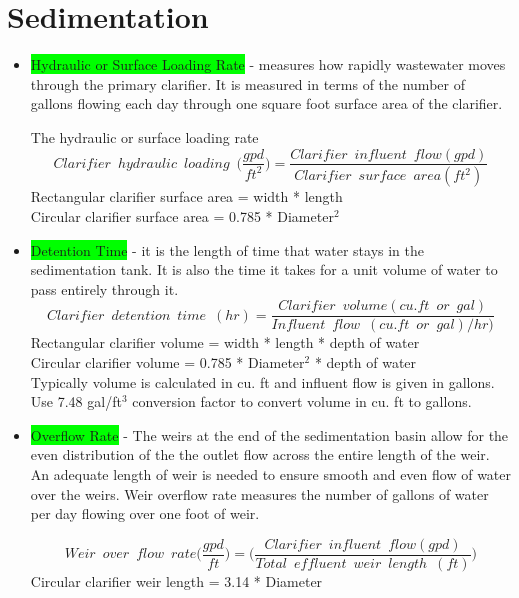 \documentclass{article}
\begin{document}
\section{Sedimentation}
\begin{itemize}
\item \colorbox{lime}{Hydraulic or Surface Loading Rate} - measures how rapidly wastewater moves through the primary clarifier.  It is measured in terms of the number of gallons flowing each day through one square foot surface area of the clarifier.

The hydraulic or surface loading rate  
$$Clarifier \enspace hydraulic \enspace loading \enspace 	\Big(\dfrac{gpd}{ft^2}\Big) =\dfrac{Clarifier \enspace influent 	\enspace flow (gpd)}{Clarifier \enspace surface \enspace area 	(ft^2)}$$ 
		Rectangular clarifier surface area  = width * length\\
		Circular clarifier surface area  = 0.785 * Diameter$^2 $\\
\item \colorbox{lime}{Detention Time} - it is the length of time that water stays in the sedimentation tank.  It is also the time it takes for a unit volume of water to pass entirely through it.\\
$$Clarifier \enspace detention \enspace time \enspace (hr) = 	\dfrac{ Clarifier \enspace volume (cu.ft \enspace or \enspace gal)}{Influent \enspace flow \enspace (cu.ft \enspace or \enspace gal)/hr)}$$
Rectangular clarifier volume = width * length * depth of water\\
Circular clarifier volume = 0.785 * Diameter$^2$ * depth of water\\
Typically volume is calculated in cu. ft and influent flow is given in gallons.  Use 7.48 gal/ft$^3$ conversion factor to convert volume in cu. ft to gallons.\\

\item \colorbox{lime}{Overflow Rate} - The weirs at the end of the sedimentation basin allow for the even distribution of the the outlet flow across the entire length of the weir.  An adequate length of weir is needed to ensure smooth and even flow of water over the weirs.  Weir overflow rate measures the number of gallons of water per day flowing over one foot of weir. 

		$$Weir \enspace over \enspace flow \enspace rate \Big(\dfrac{gpd}{ft}\Big) =\Big(\dfrac{Clarifier \enspace influent \enspace  flow (gpd)}{Total \enspace effluent 					\enspace weir \enspace length \enspace (ft)}\Big)$$
		Circular clarifier weir length = 3.14 * Diameter\\


\end{itemize}
\end{document}
